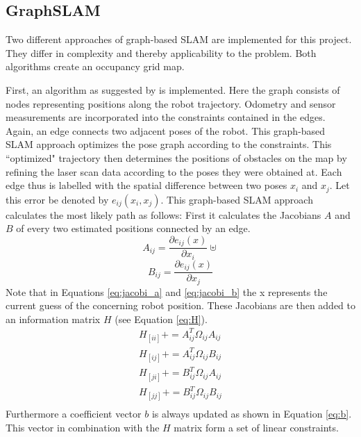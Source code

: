 \documentclass{ba-kecs}
\begin{document}
\subsection{GraphSLAM}
Two different approaches of graph-based SLAM are implemented for this project. They differ in complexity and thereby applicability to the problem. Both algorithms create an occupancy grid map. 

First, an algorithm as suggested by \citep{Grisetti} is implemented. Here the graph consists of nodes representing positions along the robot trajectory. Odometry and sensor measurements are incorporated into the constraints contained in the edges. Again, an edge connects two adjacent poses of the robot. This graph-based SLAM approach optimizes the pose graph according to the constraints. This ``optimized" trajectory then determines the positions of obstacles on the map by refining the laser scan data according to the poses they were obtained at. Each edge thus is labelled with the spatial difference between two poses \(x_i\) and \(x_j\). Let this error be denoted by \(e_{ij}(x_i, x_j)\). This graph-based SLAM approach calculates the most likely path as follows:
First it calculates the Jacobians \(A\) and \(B\) of every two estimated positions connected by an edge.
\begin{equation}
\label{eq:jacobi_a}
	A_{ij} = \frac{\partial e_{ij}(x)}{\partial x_i}\uplus
\end{equation}
\begin{equation}
\label{eq:jacobi_b}
	B_{ij} = \frac{\partial e_{ij}(x)}{\partial x_j}
\end{equation}
Note that in Equations \ref{eq:jacobi_a} and \ref{eq:jacobi_b} the x represents the current guess of the concerning robot position. These Jacobians are then added to an information matrix \(H\) (see Equation \ref{eq:H}).
\begin{equation}
\label{eq:H}
\begin{aligned}
	H_{[ii]} += A^{T}_{ij} \Omega_{ij} A_{ij} \\
	H_{[ij]} += A^{T}_{ij} \Omega_{ij} B_{ij} \\
	H_{[ji]} += B^{T}_{ij} \Omega_{ij} A_{ij} \\
	H_{[jj]} += B^{T}_{ij} \Omega_{ij} B_{ij} \\
\end{aligned}
\end{equation}
Furthermore a coefficient vector \(b\) is always updated as shown in Equation \ref{eq:b}. This vector in combination with the \(H\) matrix form a set of linear constraints.
\end{document}
